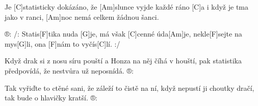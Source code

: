 
Je [C]statisticky dokázáno, že [Am]slunce vyjde každé ráno
[C]a i když je tma jako v ranci, [Am]noc nemá celkem žádnou šanci.

®: /: Statis[F]tika nuda [G]je, má však [C]cenné úda[Am]je,
nekle[F]sejte na mys[G]li, ona [F]nám to vyčís[C]lí. :/

Když drak si z nosu síru pouští a Honza na něj číhá v houští,
pak statistika předpovídá, že nestvůra už neposnídá.   
®:

Tak vyřiďte to ctěné sani, že záleží to čistě na ní,
když nepustí ji choutky dračí, tak bude o hlavičky kratší.   
®: